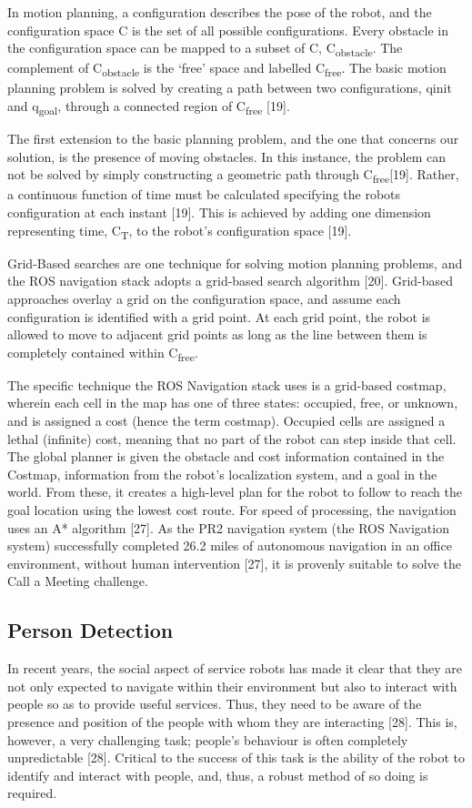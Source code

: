 \documentclass{article}
\begin{document}
\begin{multicols}{2}
In motion planning, a configuration describes the pose of the robot, and the configuration space C is the set of all possible configurations. Every obstacle in the configuration space can be mapped to a subset of C, C\textsubscript{obstacle}. The complement of C\textsubscript{obstacle} is the ‘free’ space and labelled C\textsubscript{free}. The basic motion planning problem is solved by creating a path between two configurations, qinit and q\textsubscript{goal}, through a connected region of C\textsubscript{free} [19].

The first extension to the basic planning problem, and the one that concerns our solution, is the presence of moving obstacles. In this instance, the problem can not be solved by simply constructing a geometric path through C\textsubscript{free}[19]. Rather, a continuous function of time must be calculated specifying the robots configuration at each instant [19]. This is achieved by adding one dimension representing time, C\textsubscript{T}, to the robot’s configuration space [19].

Grid-Based searches are one technique for solving motion planning problems, and the ROS navigation stack adopts a grid-based search algorithm [20]. Grid-based approaches overlay a grid on the configuration space, and assume each configuration is identified with a grid point. At each grid point, the robot is allowed to move to adjacent grid points as long as the line between them is completely contained within C\textsubscript{free}.

The specific technique the ROS Navigation stack uses is a grid-based costmap, wherein each cell in the map has one of three states: occupied, free, or unknown, and is assigned a cost (hence the term costmap). Occupied cells are assigned a lethal (infinite) cost, meaning that no part of the robot can step inside that cell. The global planner is given the obstacle and cost information contained in the Costmap, information from the robot’s localization system, and a goal in the world. From these, it creates a high-level plan for the robot to follow to reach the goal location using the lowest cost route. For speed of processing, the navigation uses an A* algorithm [27]. As the PR2 navigation system (the ROS Navigation system) successfully completed 26.2 miles of autonomous navigation in an office environment, without human intervention [27], it is provenly suitable to solve the Call a Meeting challenge.

\subsection{Person Detection}
In recent years, the social aspect of service robots has made it clear that they are not only expected to navigate within their environment but also to interact with people so as to provide useful services.  Thus, they need to be aware of the presence and position of the people with whom they are interacting [28]. This is, however, a very challenging task; people’s behaviour is often completely unpredictable [28]. Critical to the success of this task is the ability of the robot to identify and interact with people, and, thus, a robust method of so doing is required.


\end{multicols}
\end{document}
